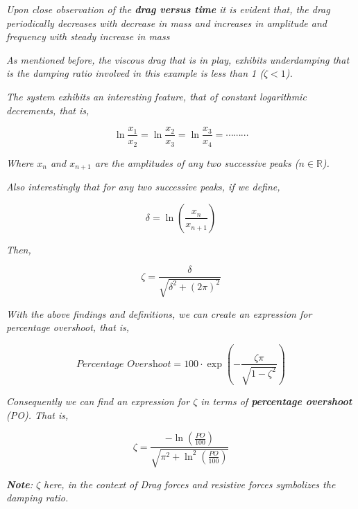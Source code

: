 \textit{Upon close observation of the \textbf{drag versus time} it is evident that, the drag periodically decreases with decrease in mass and increases in amplitude and frequency with steady increase in mass}

\textit{As mentioned before, the viscous drag that is in play, exhibits underdamping that is the damping ratio involved in this example is less than 1 ($\zeta < 1$).}

\textit{The system exhibits an interesting feature, that of constant logarithmic decrements, that is,}
        
    $$\ln{\frac{x_1}{x_2}} = \ln{\frac{x_2}{x_3}} = \ln{\frac{x_3}{x_4}} = \cdots\cdots\cdots$$
        
\textit{Where $x_n$ and $x_{n + 1}$ are the amplitudes of any two successive peaks ($n \in \mathbb{R}$).}
        
\textit{Also interestingly that for any two successive peaks, if we define,}
        
    $$\delta = \ln{\left(\frac{x_n}{x_{n + 1}}\right)}$$
        
\textit{Then,}
        
    $$\zeta = \frac{\delta}{\sqrt{\delta^2 + \left(2\pi\right)^2}}$$
        
\textit{With the above findings and definitions, we can create an expression for percentage overshoot, that is,}
        
    $$\textit{Percentage Overshoot} = 100\cdot\exp{\left(-\frac{\zeta\pi}{\sqrt{1 - \zeta^2}}\right)}$$
        
\textit{Consequently we can find an expression for $\zeta$ in terms of \textbf{percentage overshoot} (PO). That is,}
        
    $$\zeta = \frac{-\ln{\left(\frac{PO}{100}\right)}}{\sqrt{\pi^2 + \ln^2{\left(\frac{PO}{100}\right)}}}$$
        
\textit{\textbf{Note}: $\zeta$ here, in the context of Drag forces and resistive forces symbolizes the damping ratio.}

